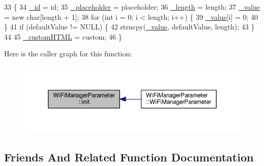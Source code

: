 \begin{DoxyCode}
33                                                                                                            
                            \{
34   \hyperlink{class_wi_fi_manager_parameter_a2b468d83df6e0714c18a38f09e7996ed}{\_id} = id;
35   \hyperlink{class_wi_fi_manager_parameter_aceb6003c96280319fb19f83ebaf3034b}{\_placeholder} = placeholder;
36   \hyperlink{class_wi_fi_manager_parameter_a30ca2df3654651a1b5320261a061b774}{\_length} = length;
37   \hyperlink{class_wi_fi_manager_parameter_a80c6492e74603e4df46219b23580ecb6}{\_value} = \textcolor{keyword}{new} \textcolor{keywordtype}{char}[length + 1];
38   \textcolor{keywordflow}{for} (\textcolor{keywordtype}{int} i = 0; i < length; i++) \{
39     \hyperlink{class_wi_fi_manager_parameter_a80c6492e74603e4df46219b23580ecb6}{\_value}[i] = 0;
40   \}
41   \textcolor{keywordflow}{if} (defaultValue != NULL) \{
42     strncpy(\hyperlink{class_wi_fi_manager_parameter_a80c6492e74603e4df46219b23580ecb6}{\_value}, defaultValue, length);
43   \}
44 
45   \hyperlink{class_wi_fi_manager_parameter_a3823cb117da1a75860cc3e81b0c6f80d}{\_customHTML} = custom;
46 \}
\end{DoxyCode}
Here is the caller graph for this function\+:\nopagebreak
\begin{figure}[H]
\begin{center}
\leavevmode
\includegraphics[width=350pt]{d7/d08/class_wi_fi_manager_parameter_a137b764027d3851a428f3ab185a5660f_icgraph}
\end{center}
\end{figure}


\subsection{Friends And Related Function Documentation}
\mbox{\label{class_wi_fi_manager_parameter_a56d1e08e3880a330575332abac06e6c8}} 
